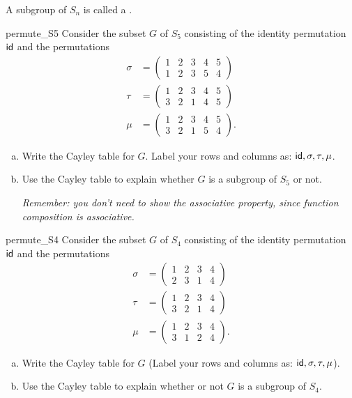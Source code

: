 \begin{defn}\label{def_perm_group}
A subgroup of $S_n$ is called a .
\end{defn}

\begin{exercise}{permute_S5}
Consider the subset $G$ of $S_5$ consisting of the identity
permutation ${\sf{i}d}$ and the permutations 
\begin{align*}
\sigma
& =
\begin{pmatrix}
1 & 2 & 3 & 4 & 5 \\
1 & 2 & 3 & 5 & 4
\end{pmatrix} \\
\tau
& =
\begin{pmatrix}
1 & 2 & 3 & 4 & 5 \\
3 & 2 & 1 & 4 & 5
\end{pmatrix} \\
\mu
& =
\begin{pmatrix}
1 & 2 & 3 & 4 & 5 \\
3 & 2 & 1 & 5 & 4
\end{pmatrix}.
\end{align*}
\begin{enumerate}[(a)]
\item
Write the Cayley table for $G$. Label your rows and columns as: ${\sf{i}d}, \sigma, \tau, \mu$.
\item
Use the Cayley table to explain whether $G$ is a subgroup of $S_5$ or not.  

\medskip
\emph{Remember: you don't need to show the associative property, since function composition is associative.}
\end{enumerate}
\end{exercise}

\begin{exercise}{permute_S4}
Consider the subset $G$ of $S_4$ consisting of the identity
permutation ${\sf{i}d}$ and the permutations 
\begin{align*}
\sigma
& =
\begin{pmatrix}
1 & 2 & 3 & 4  \\
2 & 3 & 1 & 4
\end{pmatrix} \\
\tau
& =
\begin{pmatrix}
1 & 2 & 3 & 4  \\
3 & 2 & 1 & 4 
\end{pmatrix} \\
\mu
& =
\begin{pmatrix}
1 & 2 & 3 & 4  \\
3 & 1 & 2 & 4 
\end{pmatrix}.
\end{align*}
\begin{enumerate}[(a)]
\item
Write the Cayley table for $G$ (Label your rows and columns as: ${\sf{i}d}, \sigma, \tau, \mu$).
\item
Use the Cayley table to explain whether or not $G$ is a subgroup of $S_4$.
\end{enumerate}
\end{exercise}

